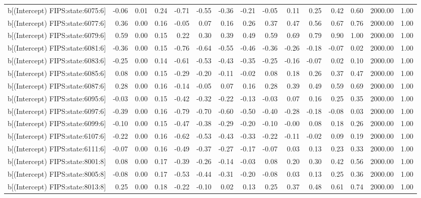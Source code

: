 \begin{table}[ht]
\begin{tabular}{rrrrrrrrrrrrrrr}
  b[(Intercept) FIPS:state:6075:6] & -0.06 & 0.01 & 0.24 & -0.71 & -0.55 & -0.36 & -0.21 & -0.05 & 0.11 & 0.25 & 0.42 & 0.60 & 2000.00 & 1.00 \\ 
  b[(Intercept) FIPS:state:6077:6] & 0.36 & 0.00 & 0.16 & -0.05 & 0.07 & 0.16 & 0.26 & 0.37 & 0.47 & 0.56 & 0.67 & 0.76 & 2000.00 & 1.00 \\ 
  b[(Intercept) FIPS:state:6079:6] & 0.59 & 0.00 & 0.15 & 0.22 & 0.30 & 0.39 & 0.49 & 0.59 & 0.69 & 0.79 & 0.90 & 1.00 & 2000.00 & 1.00 \\ 
  b[(Intercept) FIPS:state:6081:6] & -0.36 & 0.00 & 0.15 & -0.76 & -0.64 & -0.55 & -0.46 & -0.36 & -0.26 & -0.18 & -0.07 & 0.02 & 2000.00 & 1.00 \\ 
  b[(Intercept) FIPS:state:6083:6] & -0.25 & 0.00 & 0.14 & -0.61 & -0.53 & -0.43 & -0.35 & -0.25 & -0.16 & -0.07 & 0.02 & 0.10 & 2000.00 & 1.00 \\ 
  b[(Intercept) FIPS:state:6085:6] & 0.08 & 0.00 & 0.15 & -0.29 & -0.20 & -0.11 & -0.02 & 0.08 & 0.18 & 0.26 & 0.37 & 0.47 & 2000.00 & 1.00 \\ 
  b[(Intercept) FIPS:state:6087:6] & 0.28 & 0.00 & 0.16 & -0.14 & -0.05 & 0.07 & 0.16 & 0.28 & 0.39 & 0.49 & 0.59 & 0.69 & 2000.00 & 1.00 \\ 
  b[(Intercept) FIPS:state:6095:6] & -0.03 & 0.00 & 0.15 & -0.42 & -0.32 & -0.22 & -0.13 & -0.03 & 0.07 & 0.16 & 0.25 & 0.35 & 2000.00 & 1.00 \\ 
  b[(Intercept) FIPS:state:6097:6] & -0.39 & 0.00 & 0.16 & -0.79 & -0.70 & -0.60 & -0.50 & -0.40 & -0.28 & -0.18 & -0.08 & 0.03 & 2000.00 & 1.00 \\ 
  b[(Intercept) FIPS:state:6099:6] & -0.10 & 0.00 & 0.15 & -0.47 & -0.38 & -0.29 & -0.20 & -0.10 & -0.00 & 0.08 & 0.18 & 0.26 & 2000.00 & 1.00 \\ 
  b[(Intercept) FIPS:state:6107:6] & -0.22 & 0.00 & 0.16 & -0.62 & -0.53 & -0.43 & -0.33 & -0.22 & -0.11 & -0.02 & 0.09 & 0.19 & 2000.00 & 1.00 \\ 
  b[(Intercept) FIPS:state:6111:6] & -0.07 & 0.00 & 0.16 & -0.49 & -0.37 & -0.27 & -0.17 & -0.07 & 0.03 & 0.13 & 0.23 & 0.33 & 2000.00 & 1.00 \\ 
  b[(Intercept) FIPS:state:8001:8] & 0.08 & 0.00 & 0.17 & -0.39 & -0.26 & -0.14 & -0.03 & 0.08 & 0.20 & 0.30 & 0.42 & 0.56 & 2000.00 & 1.00 \\ 
  b[(Intercept) FIPS:state:8005:8] & -0.08 & 0.00 & 0.17 & -0.53 & -0.44 & -0.31 & -0.20 & -0.08 & 0.03 & 0.13 & 0.25 & 0.36 & 2000.00 & 1.00 \\ 
  b[(Intercept) FIPS:state:8013:8] & 0.25 & 0.00 & 0.18 & -0.22 & -0.10 & 0.02 & 0.13 & 0.25 & 0.37 & 0.48 & 0.61 & 0.74 & 2000.00 & 1.00 \\ 

\end{tabular}
\end{table}
